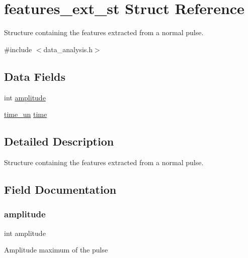 \hypertarget{structfeatures__ext__st}{}\section{features\+\_\+ext\+\_\+st Struct Reference}
\label{structfeatures__ext__st}


Structure containing the features extracted from a normal pulse.  




{\ttfamily \#include $<$data\+\_\+analysis.\+h$>$}

\subsection*{Data Fields}
\begin{DoxyCompactItemize}
\item 
int \mbox{\hyperlink{structfeatures__ext__st_ad07f93f796ba0af60659c528f7611d4a}{amplitude}}
\item 
\mbox{\hyperlink{data__analysis_8h_a6bcac60981154f19ecdcba9856b481cc}{time\+\_\+un}} \mbox{\hyperlink{structfeatures__ext__st_a68afe404040b1ba0bdaaac26efd70dbe}{time}}
\end{DoxyCompactItemize}


\subsection{Detailed Description}
Structure containing the features extracted from a normal pulse. 

\subsection{Field Documentation}
\mbox{\label{structfeatures__ext__st_ad07f93f796ba0af60659c528f7611d4a}} 
\subsubsection{\texorpdfstring{amplitude}{amplitude}}
{\footnotesize\ttfamily int amplitude}

Amplitude maximum of the pulse \mbox{\label{structfeatures__ext__st_a68afe404040b1ba0bdaaac26efd70dbe}} 
